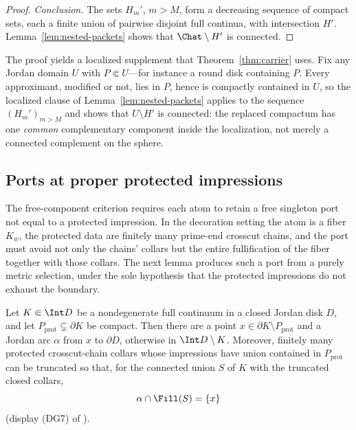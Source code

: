 \begin{proof}
\emph{Conclusion.}
The sets $H_m'$, $m>M$, form a decreasing sequence of compact sets, each
a finite union of pairwise disjoint full continua, with intersection
$H'$.  Lemma~\ref{lem:nested-packets} shows that $\Chat\setminus H'$ is
connected.
\end{proof}

\begin{remark}\label{rem:F-localized}
The proof yields a localized supplement that Theorem~\ref{thm:carrier}
uses.  Fix any Jordan domain $U$ with $P\Subset U$---for instance a
round disk containing $P$.  Every approximant, modified or not, lies in
$P$, hence is compactly contained in $U$, so the localized clause of
Lemma~\ref{lem:nested-packets} applies to the sequence $(H_m')_{m>M}$
and shows that $U\setminus H'$ is connected: the replaced compactum has
one \emph{common} complementary component inside the localization, not
merely a connected complement on the sphere.
\end{remark}

\subsection{Ports at proper protected impressions}\label{subsec:F-port}

The free-component criterion requires each atom to retain a free
singleton port not equal to a protected impression.  In the decoration
setting the atom is a fiber $K_w$, the protected data are finitely many
prime-end crosscut chains, and the port must avoid not only the chains'
collars but the entire fullification of the fiber together with those
collars.  The next lemma produces such a port from a purely metric
selection, under the sole hypothesis that the protected impressions do
not exhaust the boundary.

\begin{lemma}\label{lem:impression-port}
Let $K\Subset\Int D$ be a nondegenerate full continuum in a closed
Jordan disk $D$, and let $P_{\mathrm{prot}}\subsetneq\partial K$ be
compact.  Then there are a point
$x\in\partial K\setminus P_{\mathrm{prot}}$ and a Jordan arc $\alpha$
from $x$ to $\partial D$, otherwise in $\Int D\setminus K$.  Moreover,
finitely many protected crosscut-chain collars whose impressions have
union contained in $P_{\mathrm{prot}}$ can be truncated so that, for the
connected union $S$ of $K$ with the truncated closed collars,
\begin{equation}\label{eq:F-port}
\alpha\cap\Fill(S)=\{x\}
\end{equation}
(display (DG7) of \cite{MWman}).
\end{lemma}


